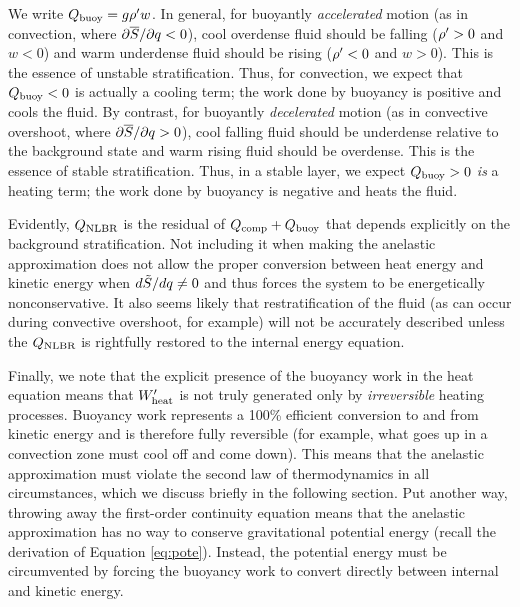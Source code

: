 \documentclass[12pt]{article}
\newcommand{\heatnlbr}{Q_{\rm NLBR}}
\newcommand{\heatcomp}{Q_{\rm comp}}
\newcommand{\heatbuoy}{Q_{\rm buoy}}
\newcommand{\wpheat}{W^\prime_{\rm heat}}
\begin{document}
We write $\heatbuoy=g\rhoprime w$. In general, for buoyantly \textit{accelerated} motion (as in convection, where $\partial\overline{S}/\partial q<0$), cool overdense fluid should be falling (${\rho^\prime}>0$ and $w<0$) and warm underdense fluid should be rising (${\rho^\prime}<0$ and $w>0$). This is the essence of unstable stratification. Thus, for convection, we expect that $\heatbuoy<0$ is actually a cooling term; the work done by buoyancy is positive and cools the fluid. By contrast, for buoyantly \textit{decelerated} motion (as in convective overshoot, where $\partial\overline{S}/\partial q>0$), cool falling fluid should be underdense relative to the background state and warm rising fluid should be overdense. This is the essence of stable stratification. Thus, in a stable layer, we expect $\heatbuoy > 0$ \textit{is} a heating term; the work done by buoyancy is negative and heats the fluid. 

Evidently, $\heatnlbr$ is the residual of $\heatcomp+\heatbuoy$ that depends explicitly on the background stratification. Not including it when making the anelastic approximation does not allow the proper conversion between heat energy and kinetic energy when $d\tilde{S}/dq\neq0$ and thus forces the system to be energetically nonconservative. It also seems likely that restratification of the fluid (as can occur during convective overshoot, for example) will not be accurately described unless the $\heatnlbr$ is rightfully restored to the internal energy equation. 

Finally, we note that the explicit presence of the buoyancy work in the heat equation means that $\wpheat$ is not truly generated only by \textit{irreversible} heating processes. Buoyancy work represents a 100\% efficient conversion to and from kinetic energy and is therefore fully reversible (for example, what goes up in a convection zone must cool off and come down). This means that the anelastic approximation must violate the second law of thermodynamics in all circumstances, which we discuss briefly in the following section. Put another way, throwing away the first-order continuity equation means that the anelastic approximation has no way to conserve gravitational potential energy (recall the derivation of Equation \eqref{eq:pote}). Instead, the potential energy must be circumvented by forcing the buoyancy work to convert directly between internal and kinetic energy. 
\end{document}
